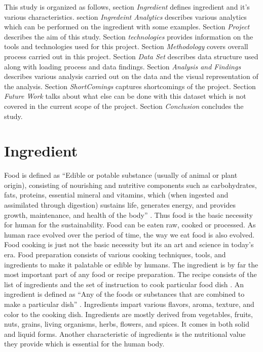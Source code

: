 \documentclass[sigconf]{acmart}
\begin{document}
This study is organized as follows, section \emph{Ingredient} defines ingredient and it's various characteristics. section \emph{Ingredeint Analytics} describes various analytics which can be performed on the ingredient with some examples. Section \emph{Project} describes the aim of this study. Section \emph{technologies} provides information on the tools and technologies used for this project. Section \emph{Methodology} covers overall process carried out in this project. Section \emph{Data Set} describes data structure used along with loading process and data findings. Section \emph{Analysis and Findings} describes various analysis carried out on the data and the visual representation of the analysis. Section \emph{ShortComings} captures shortcomings of the project. Section \emph{Future Work} talks about what else can be done with this dataset which is not covered in the current scope of the project. Section \emph{Conclusion} concludes the study.  

\section{Ingredient}
Food is defined as ``Edible or potable substance (usually of animal or plant origin), consisting of nourishing and nutritive components such as carbohydrates, fats, proteins, essential mineral and vitamins, which (when ingested and assimilated through digestion) sustains life, generates energy, and provides growth, maintenance, and health of the body'' \cite{www-businessdictionary}. Thus food is the basic necessity for human for the sustainability. Food can be eaten raw, cooked or processed. As human race evolved over the period of time, the way we eat food is also evolved. Food cooking is just not the basic necessity but its an art and science in today's era. Food preparation consists of various cooking techniques, tools, and ingredients to make it palatable or edible by humans. The ingredient is by far the most important part of any food or recipe preparation. The recipe consists of the list of ingredients and the set of instruction to cook particular food dish \cite{www-collinsdictionary}. An ingredient is defined as ``Any of the foods or substances that are combined to make a particular dish'' \cite{www-oxforddictionaries}. Ingredients impart various flavors, aroma, texture, and color to the cooking dish. Ingredients are mostly derived from vegetables, fruits, nuts, grains, living organisms, herbs, flowers, and spices. It comes in both solid and liquid forms. Another characteristic of ingredients is the nutritional value they provide which is essential for the human body.
\end{document}
